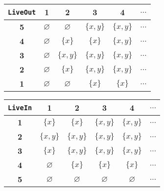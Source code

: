 \begin{minipage}{0.5\textwidth}
    \begin{figure}[H]
        \centering
        \begin{tabular}{|c|c|c|c|c|c|}
            \hline
            \texttt{LiveOut}& \textbf{1} & \textbf{2} & \textbf{3} & \textbf{4} & \textbf{$\dots$} \\
            \hline
            \textbf{5} & $\varnothing$ & $\varnothing$ & $\{x,y\}$ & $\{x,y\}$ & $\dots$ \\
            \hline
            \textbf{4} & $\varnothing$ & $\{x\}$ & $\{x\}$ 
            & $\{x,y\}$ & $\dots$ \\
            \hline
            \textbf{3} & $\varnothing$ &$\{x, y\}$ & $\{x,y\}$ & $\{x,y\}$ & $\dots$ \\
            \hline
            \textbf{2} & $\varnothing$ & $\{x\}$ & $\{x,y\}$  & $\{x,y\}$ & $\dots$ \\
            \hline
            \textbf{1} & $\varnothing$  & $\varnothing$ & $\{x\}$ & $\{x\}$ & $\dots$ \\
            \hline
        \end{tabular}
    \end{figure}
\end{minipage}
\begin{minipage}{0.5\textwidth}
    \begin{figure}[H]
        \centering
        \begin{tabular}{|c|c|c|c|c|c|}
            \hline
            \texttt{LiveIn}& \textbf{1} & \textbf{2} & \textbf{3} & \textbf{4} & \textbf{$\dots$} \\
            \hline
            \textbf{1} & $\{x\}$ & $\{x\}$ & $\{x,y\}$ & $\{x,y\}$ & $\dots$ \\
            \hline
            \textbf{2} & $\{x, y\}$ & $\{x,y\}$ & $\{x,y\}$ 
            & $\{x,y\}$ & $\dots$ \\
            \hline
            \textbf{3} & $\{x\}$ &$\{x,y\}$ & $\{x,y\}$ & $\{x,y\}$ & $\dots$ \\
            \hline
            \textbf{4} & $\varnothing$ & $\{x\}$ & $\{x\}$  & $\{x\}$ & $\dots$ \\
            \hline
            \textbf{5} & $\varnothing$  & $\varnothing$ & $\varnothing$ & $\varnothing$ & $\dots$ \\
            \hline
        \end{tabular}
    \end{figure}
\end{minipage}

